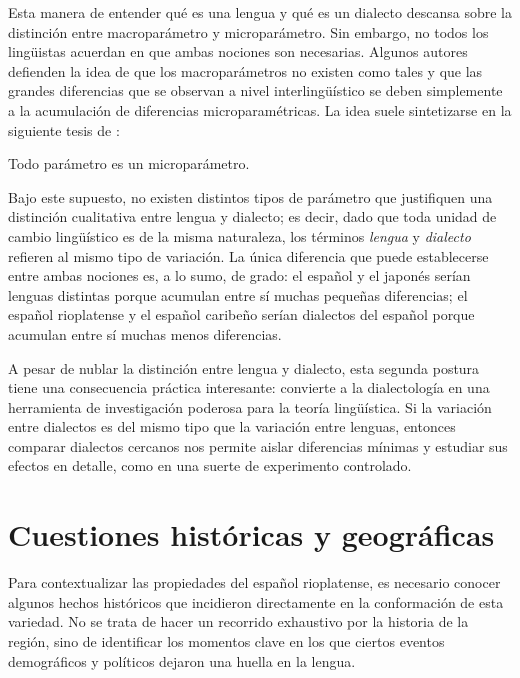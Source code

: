 Esta manera de entender qué es una lengua y qué es un dialecto descansa sobre la
distinción entre macroparámetro y microparámetro. Sin embargo, no todos los
lingüistas acuerdan en que ambas nociones son necesarias. Algunos autores
defienden la idea de que los macroparámetros no existen como tales y que las
grandes diferencias que se observan a nivel interlingüístico se deben
simplemente a la acumulación de diferencias microparamétricas. La idea suele
sintetizarse en la siguiente tesis de \textcite{kayne2005}:

\begin{exe}
  \ex\label{ex:15-kayne} Todo parámetro es un microparámetro.
\end{exe}

Bajo este supuesto, no existen distintos tipos de parámetro que justifiquen una
distinción cualitativa entre lengua y dialecto; es decir, dado que toda unidad
de cambio lingüístico es de la misma naturaleza, los términos \textit{lengua} y
\textit{dialecto} refieren al mismo tipo de variación. La única diferencia que
puede establecerse entre ambas nociones es, a lo sumo, de grado: el español y el
japonés serían lenguas distintas porque acumulan entre sí muchas pequeñas
diferencias; el español rioplatense y el español caribeño serían dialectos del
español porque acumulan entre sí muchas menos diferencias.

A pesar de nublar la distinción entre lengua y dialecto, esta segunda postura
tiene una consecuencia práctica interesante: convierte a la dialectología en una
herramienta de investigación poderosa para la teoría lingüística. Si la
variación entre dialectos es del mismo tipo que la variación entre lenguas,
entonces comparar dialectos cercanos nos permite aislar diferencias mínimas y
estudiar sus efectos en detalle, como en una suerte de experimento controlado.

\section{Cuestiones históricas y geográficas}\label{sec:15-historia}

Para contextualizar las propiedades del español rioplatense, es necesario conocer
algunos hechos históricos que incidieron directamente en la conformación de esta
variedad. No se trata de hacer un recorrido exhaustivo por la historia de la
región, sino de identificar los momentos clave en los que ciertos eventos
demográficos y políticos dejaron una huella en la lengua.

